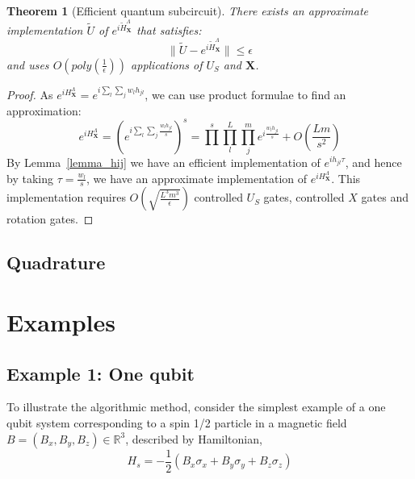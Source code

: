 \documentclass[10pt]{amsart}
\newtheorem{theorem}{Theorem}
\newcommand{\X}{\textbf{X}}
\begin{document}
\begin{theorem}[Efficient quantum subcircuit]
There exists an approximate implementation $\tilde U$ of $e^{i\tilde{H}^{\Lambda}_{\X}}$ that satisfies:
\begin{equation*}
    \|\tilde U - e^{i\tilde{H}^{\Lambda}_{\X}}\| \leq \epsilon 
\end{equation*}
and uses $O\left(poly(\frac{1}{\epsilon})\right)$ applications of $U_S$ and $\X$.
\end{theorem}
\begin{proof}
    As $e^{iH^{\Lambda}_{\X}} = e^{i \sum_l \sum_j w_lh_{jl}}$, we can use product formulae to find an approximation:
    \begin{equation}
        e^{iH^{\Lambda}_{\X}} =\left(e^{i \sum_l \sum_j \frac{w_lh_{jl}}{s}}\right)^s = \prod^s \prod_l^L \prod_j^m e^{i\frac{w_lh_{jl}}{s}} + O\left(\frac{Lm}{s^2}\right)
    \end{equation}
    By Lemma~\ref{lemma_hij} we have an efficient implementation of $e^{ih_{jl}\tau}$, and hence by taking $\tau = \frac{w_l}{s}$, we have an approximate implementation of $e^{iH^{\Lambda}_{\X}}$. This implementation requires $O\left(\sqrt{\frac{L^{3}m^{3}}{\epsilon}}\right)$ controlled $U_S$ gates, controlled $X$ gates and  rotation gates.
\end{proof}
\subsection{Quadrature}
\section{Examples}

\subsection{Example 1: One qubit}
To illustrate the algorithmic method, consider the simplest example of a one qubit system corresponding to a spin 1/2 particle in a magnetic field $B=(B_x,B_y,B_z) \in \mathbb{R}^3$, described by Hamiltonian,  
$$ H_s = -\frac{1}{2}(B_x\sigma_x + B_y\sigma_y + B_z\sigma_z) $$
\end{document}
